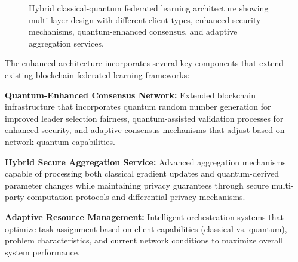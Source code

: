 \documentclass[10pt,journal,compsoc]{IEEEtran}
\begin{document}
\begin{figure}[!t]
{
}
\caption{Hybrid classical-quantum federated learning architecture showing multi-layer design with different client types, enhanced security mechanisms, quantum-enhanced consensus, and adaptive aggregation services.}
\label{fig:hybrid_architecture}
\end{figure}

The enhanced architecture incorporates several key components that extend existing blockchain federated learning frameworks:

\textbf{Quantum-Enhanced Consensus Network:} Extended blockchain infrastructure that incorporates quantum random number generation for improved leader selection fairness, quantum-assisted validation processes for enhanced security, and adaptive consensus mechanisms that adjust based on network quantum capabilities.

\textbf{Hybrid Secure Aggregation Service:} Advanced aggregation mechanisms capable of processing both classical gradient updates and quantum-derived parameter changes while maintaining privacy guarantees through secure multi-party computation protocols and differential privacy mechanisms.

\textbf{Adaptive Resource Management:} Intelligent orchestration systems that optimize task assignment based on client capabilities (classical vs. quantum), problem characteristics, and current network conditions to maximize overall system performance.
\end{document}
